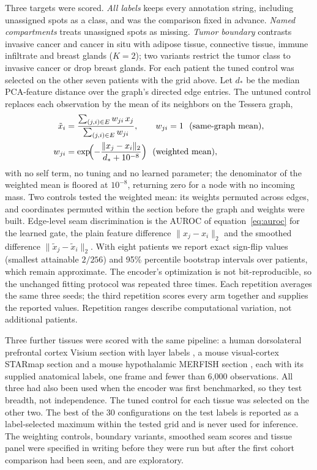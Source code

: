 \documentclass[11pt]{article}
\begin{document}
Three targets were scored. \emph{All labels} keeps every annotation string, including unassigned spots as a class, and was the comparison fixed in advance. \emph{Named compartments} treats unassigned spots as missing. \emph{Tumor boundary} contrasts invasive cancer and cancer in situ with adipose tissue, connective tissue, immune infiltrate and breast glands (\(K=2\)); two variants restrict the tumor class to invasive cancer or drop breast glands. For each patient the tuned control was selected on the other seven patients with the grid above. Let \(d_*\) be the median PCA-feature distance over the graph's directed edge entries. The untuned control replaces each observation by the mean of its neighbors on the Tessera graph,
\begin{align}
\tilde x_i&=\frac{\sum_{(j,i)\in E}w_{ji}\,x_j}{\sum_{(j,i)\in E}w_{ji}},\qquad w_{ji}=1\ \ (\text{same-graph mean}),\nonumber\\
w_{ji}&=\exp\!\Bigl(-\frac{\lVert x_j-x_i\rVert_2}{d_*+10^{-8}}\Bigr)\ \ (\text{weighted mean}),\label{eq:neighborhood}
\end{align}
with no self term, no tuning and no learned parameter; the denominator of the weighted mean is floored at \(10^{-8}\), returning zero for a node with no incoming mass. Two controls tested the weighted mean: its weights permuted across edges, and coordinates permuted within the section before the graph and weights were built. Edge-level seam discrimination is the AUROC of equation~\eqref{eq:auroc} for the learned gate, the plain feature difference \(\lVert x_j-x_i\rVert_2\) and the smoothed difference \(\lVert\tilde x_j-\tilde x_i\rVert_2\). With eight patients we report exact sign-flip values (smallest attainable \(2/256\)) and 95\% percentile bootstrap intervals over patients, which remain approximate. The encoder's optimization is not bit-reproducible, so the unchanged fitting protocol was repeated three times. Each repetition averages the same three seeds; the third repetition scores every arm together and supplies the reported values. Repetition ranges describe computational variation, not additional patients.

Three further tissues were scored with the same pipeline: a human dorsolateral prefrontal cortex Visium section with layer labels \citep{maynard2021dlpfc}, a mouse visual-cortex STARmap section \citep{wang2018starmap} and a mouse hypothalamic MERFISH section \citep{moffitt2018merfish}, each with its supplied anatomical labels, one frame and fewer than 6,000 observations. All three had also been used when the encoder was first benchmarked, so they test breadth, not independence. The tuned control for each tissue was selected on the other two. The best of the 30 configurations on the test labels is reported as a label-selected maximum within the tested grid and is never used for inference. The weighting controls, boundary variants, smoothed seam scores and tissue panel were specified in writing before they were run but after the first cohort comparison had been seen, and are exploratory.
\end{document}
